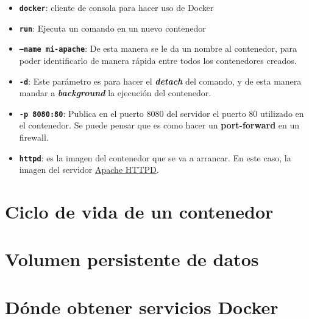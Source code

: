 \begin{itemize}
    \item \textbf{\texttt{docker}}: cliente de consola para hacer uso de Docker
    \item \textbf{\texttt{run}}: Ejecuta un comando en un nuevo contenedor
    \item \textbf{\texttt{--name mi-apache}}: De esta manera se le da un nombre al contenedor, para poder identificarlo de manera rápida entre todos los contenedores creados.
    \item \textbf{\texttt{-d}}: Este parámetro es para hacer el \textbf{\textit{detach}} del comando, y de esta manera mandar a \textbf{\textit{background}} la ejecución del contenedor.
    \item \textbf{\texttt{-p 8080:80}}: Publica en el puerto 8080 del servidor el puerto 80 utilizado en el contenedor. Se puede pensar que es como hacer un \textbf{port-forward} en un firewall.
    \item \textbf{\texttt{httpd}}: es la imagen del contenedor que se va a arrancar. En este caso, la imagen del servidor \href{https://hub.docker.com/_/httpd}{Apache HTTPD}.
\end{itemize}


\section{Ciclo de vida de un contenedor}

\section{Volumen persistente de datos}


\section{Dónde obtener servicios Docker}


